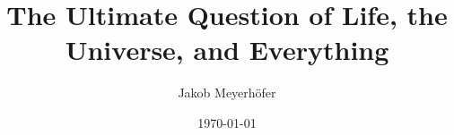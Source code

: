    \title{The Ultimate Question of Life, the Universe, and Everything}

    \author{Jakob Meyerhöfer}

    \date{\today}

    \newcommand{\examinerA}{Prof. Dr. Ralf Hinze}
    \newcommand{\examinerB}{Sebastian Schloßer, M.Sc. (Sebastian Schweizer)}

    \newcommand{\thesisType}{Bachelor}